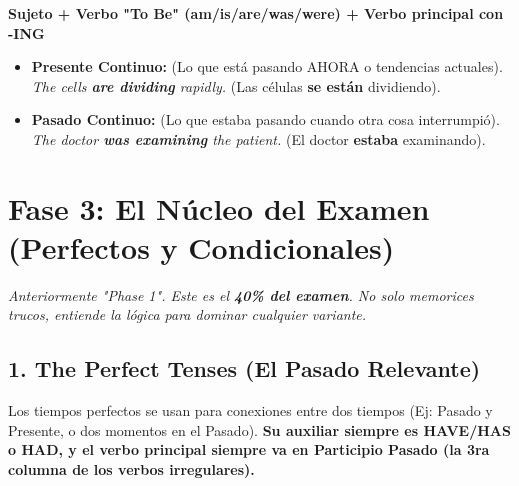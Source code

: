 \documentclass[11pt,a4paper]{article}
\begin{document}
\begin{center}
    \textbf{Sujeto + Verbo "To Be" (am/is/are/was/were) + Verbo principal con -ING}
\end{center}

\begin{itemize}[noitemsep]
    \item \textbf{Presente Continuo:} (Lo que está pasando AHORA o tendencias actuales). \\
    \textit{The cells \textbf{are dividing} rapidly.} (Las células \textbf{se están} dividiendo).
    \item \textbf{Pasado Continuo:} (Lo que estaba pasando cuando otra cosa interrumpió). \\
    \textit{The doctor \textbf{was examining} the patient.} (El doctor \textbf{estaba} examinando).
\end{itemize}

\vspace{0.4cm}

\section{Fase 3: El Núcleo del Examen (Perfectos y Condicionales)}
\textit{Anteriormente "Phase 1". Este es el \textbf{40\% del examen}. No solo memorices trucos, entiende la lógica para dominar cualquier variante.}

\subsection{1. The Perfect Tenses (El Pasado Relevante)}
Los tiempos perfectos se usan para conexiones entre dos tiempos (Ej: Pasado y Presente, o dos momentos en el Pasado). \textbf{Su auxiliar siempre es HAVE/HAS o HAD, y el verbo principal siempre va en Participio Pasado (la 3ra columna de los verbos irregulares).}
\end{document}
